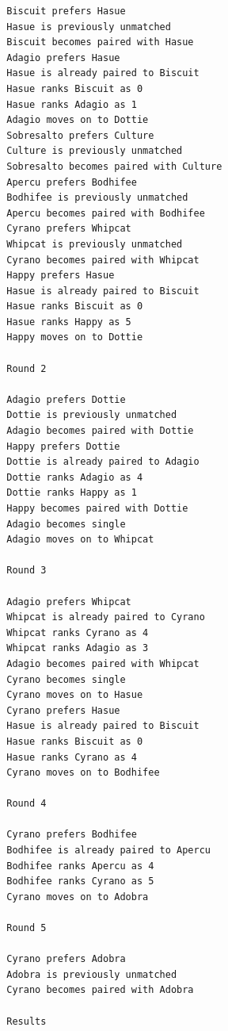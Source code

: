 \begin{enumerate}[label=(\alph*)]
\begin{lstlisting}
        Biscuit prefers Hasue
        Hasue is previously unmatched
        Biscuit becomes paired with Hasue
        Adagio prefers Hasue
        Hasue is already paired to Biscuit
        Hasue ranks Biscuit as 0
        Hasue ranks Adagio as 1
        Adagio moves on to Dottie
        Sobresalto prefers Culture
        Culture is previously unmatched
        Sobresalto becomes paired with Culture
        Apercu prefers Bodhifee
        Bodhifee is previously unmatched
        Apercu becomes paired with Bodhifee
        Cyrano prefers Whipcat
        Whipcat is previously unmatched
        Cyrano becomes paired with Whipcat
        Happy prefers Hasue
        Hasue is already paired to Biscuit
        Hasue ranks Biscuit as 0
        Hasue ranks Happy as 5
        Happy moves on to Dottie
        
        Round 2
        
        Adagio prefers Dottie
        Dottie is previously unmatched
        Adagio becomes paired with Dottie
        Happy prefers Dottie
        Dottie is already paired to Adagio
        Dottie ranks Adagio as 4
        Dottie ranks Happy as 1
        Happy becomes paired with Dottie
        Adagio becomes single
        Adagio moves on to Whipcat
        
        Round 3
        
        Adagio prefers Whipcat
        Whipcat is already paired to Cyrano
        Whipcat ranks Cyrano as 4
        Whipcat ranks Adagio as 3
        Adagio becomes paired with Whipcat
        Cyrano becomes single
        Cyrano moves on to Hasue
        Cyrano prefers Hasue
        Hasue is already paired to Biscuit
        Hasue ranks Biscuit as 0
        Hasue ranks Cyrano as 4
        Cyrano moves on to Bodhifee
        
        Round 4
        
        Cyrano prefers Bodhifee
        Bodhifee is already paired to Apercu
        Bodhifee ranks Apercu as 4
        Bodhifee ranks Cyrano as 5
        Cyrano moves on to Adobra
        
        Round 5
        
        Cyrano prefers Adobra
        Adobra is previously unmatched
        Cyrano becomes paired with Adobra
        
        Results
        

\end{lstlisting}
\end{enumerate}
